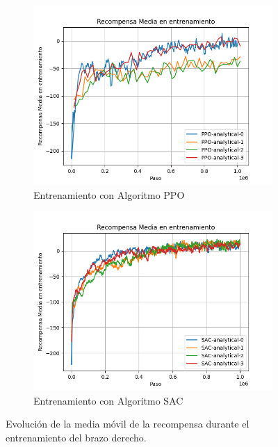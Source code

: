 \begin{figure}[h!]
	\centering
	
	\begin{subfigure}[b]{0.48\textwidth}
		\centering
		\includegraphics[width=\textwidth]{images/graphs/PPO/Right/ep_rew_mean}
		\caption{Entrenamiento con Algoritmo PPO}
		\label{fig:train-ppo-rew-right}
	\end{subfigure}
	\hfill
	\begin{subfigure}[b]{0.48\textwidth}
		\centering
		\includegraphics[width=\textwidth]{images/graphs/SAC/Right/ep_rew_mean}
		\caption{Entrenamiento con Algoritmo SAC}
		\label{fig:train-sac-rew-right}
	\end{subfigure}
	
	\caption{Evolución de la media móvil de la recompensa durante el entrenamiento del brazo derecho.}
	\label{fig:train-rew-right}
\end{figure}

